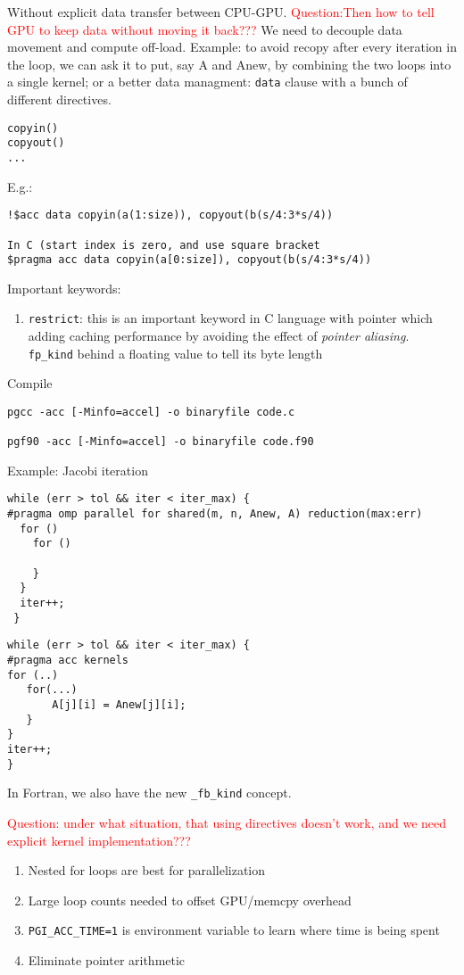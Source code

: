 Without explicit data transfer between CPU-GPU. \textcolor{red}{Question:Then
how to tell GPU to keep data without moving it back???} We need to decouple data
movement and compute off-load. Example: to avoid recopy after every iteration in
the loop, we can ask it to put, say A and Anew, by combining the two loops into
a single kernel; or a better data managment: \verb!data! clause with a bunch of
different directives.
\begin{verbatim}
copyin()
copyout()
...
\end{verbatim}
E.g.:
\begin{verbatim}
!$acc data copyin(a(1:size)), copyout(b(s/4:3*s/4))

In C (start index is zero, and use square bracket
$pragma acc data copyin(a[0:size]), copyout(b(s/4:3*s/4))
\end{verbatim}


Important keywords:
\begin{enumerate}
  \item \verb!restrict!: this is an important keyword in C language with pointer
  which adding caching performance by avoiding the effect of {\it pointer
  aliasing}. 
  \verb!fp_kind! behind a floating value to tell its byte length
\end{enumerate}


Compile
\begin{verbatim}
pgcc -acc [-Minfo=accel] -o binaryfile code.c

pgf90 -acc [-Minfo=accel] -o binaryfile code.f90
\end{verbatim}

Example: Jacobi iteration
\begin{verbatim}
while (err > tol && iter < iter_max) {
#pragma omp parallel for shared(m, n, Anew, A) reduction(max:err)
  for ()
    for ()
    
    }
  }
  iter++;
 }
\end{verbatim}

\begin{verbatim}
while (err > tol && iter < iter_max) {
#pragma acc kernels
for (..)
   for(...)
       A[j][i] = Anew[j][i];
   }
}
iter++;
}
\end{verbatim}
In Fortran, we also have the new \verb!_fb_kind! concept.

\textcolor{red}{Question: under what situation, that using directives doesn't
work, and we need explicit kernel implementation???}
\begin{enumerate}
  \item Nested for loops are best for parallelization
  \item Large loop counts needed to offset GPU/memcpy overhead
  \item \verb!PGI_ACC_TIME=1! is environment variable to learn where time is
  being spent
  \item Eliminate pointer arithmetic
\end{enumerate}

